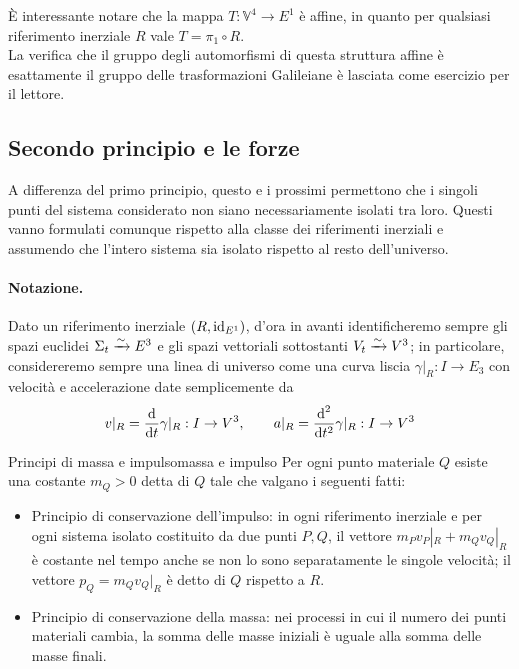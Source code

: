 \documentclass[openany]{book}
\renewcommand\V{\mathbb{V}}
\begin{document}
È interessante notare che la mappa $T:\V^4\to E^1$ è affine, in quanto per qualsiasi riferimento inerziale $R$ vale $T = \pi_1 \circ R$.\\
La verifica che il gruppo degli automorfismi di questa struttura affine è esattamente il gruppo delle trasformazioni Galileiane è lasciata come esercizio per il lettore.

\subsection{Secondo principio e le forze}

A differenza del primo principio, questo e i prossimi permettono che i singoli punti del sistema considerato non siano necessariamente isolati tra loro. Questi vanno formulati comunque rispetto alla classe dei riferimenti inerziali e assumendo che l'intero sistema sia isolato rispetto al resto dell'universo.
\paragraph{Notazione.} Dato un riferimento inerziale $(R,\operatorname{id}_{E^1})$, d'ora in avanti identificheremo sempre gli spazi euclidei $\Sigma_t \xrightarrow{\sim} E^3$ e gli spazi vettoriali sottostanti $V_t\xrightarrow{\sim} V^3$; in particolare, considereremo sempre una linea di universo come una curva liscia $\gamma |_R :I\to E_3$ con velocità e accelerazione date semplicemente da 
\[ v|_R = \frac{\text{d} }{\text{d} t}\gamma|_R : I \to V^3, \qquad a|_R = \frac{\text{d}^2 }{\text{d} t^2}\gamma|_R : I \to V^3\]

\begin{axiom}{Principi di massa e impulso}{massa e impulso}
    Per ogni punto materiale $Q$ esiste una costante $m_Q>0$ detta  di $Q$ tale che valgano i seguenti fatti:\begin{itemize}
        \item Principio di conservazione dell'impulso: in ogni riferimento inerziale e per ogni sistema isolato costituito da due punti $P,Q$, il vettore $m_P v_P|_R + m_Q v_Q|_R$ è costante nel tempo anche se non lo sono separatamente le singole velocità; il vettore $p_Q = m_Q v_Q|_R$ è detto  di $Q$ rispetto a $R$. 
        \item Principio di conservazione della massa: nei processi in cui il numero dei punti materiali cambia, la somma delle masse iniziali è uguale alla somma delle masse finali.
    \end{itemize} 
\end{axiom}
\end{document}
